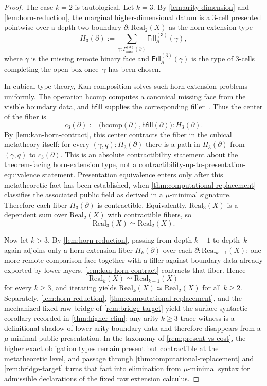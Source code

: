 \documentclass{lmcs}
\newcommand{\Real}{\mathrm{Real}}
\newcommand{\hcomp}{\mathrm{hcomp}}
\begin{document}
\begin{proof}
The case $k=2$ is tautological. Let $k=3$. By \autoref{lem:arity-dimension} and \autoref{lem:horn-reduction}, the marginal higher-dimensional datum is a $3$-cell presented pointwise over a depth-two boundary $\partial : \Real_2(X)$ as the horn-extension type
\[
  H_3(\partial)
  :=
  \sum_{\gamma : \Gamma^{(3)}_{\mathrm{miss}}(\partial)}
  \mathsf{Fill}^{(3)}_{\partial}(\gamma),
\]
where $\gamma$ is the missing remote binary face and $\mathsf{Fill}^{(3)}_{\partial}(\gamma)$ is the type of $3$-cells completing the open box once~$\gamma$ has been chosen.

In cubical type theory, Kan composition solves such horn-extension problems uniformly. The operation $\hcomp$ computes a canonical missing face from the visible boundary data, and $\mathsf{hfill}$ supplies the corresponding filler~\cite{cubical,cchm-hits}. Thus the center of the fiber is
\[
  c_3(\partial)
  :=
  \bigl(\hcomp(\partial),\mathsf{hfill}(\partial)\bigr)
  :
  H_3(\partial).
\]
By \autoref{lem:kan-horn-contract}, this center contracts the fiber in the
cubical metatheory itself: for every $(\gamma,q):H_3(\partial)$ there is a path
in $H_3(\partial)$ from $(\gamma,q)$ to $c_3(\partial)$. This is an absolute
contractibility statement about the theorem-facing horn-extension type, not a
contractibility-up-to-presentation-equivalence statement. Presentation
equivalence enters only after this metatheoretic fact has been established,
when \autoref{thm:computational-replacement} classifies the associated public
field as derived in a $\mu$-minimal signature. Therefore each fiber
$H_3(\partial)$ is contractible. Equivalently, $\Real_3(X)$ is a dependent sum
over $\Real_2(X)$ with contractible fibers, so
\[
  \Real_3(X) \simeq \Real_2(X).
\]

Now let $k>3$. By \autoref{lem:horn-reduction}, passing from depth $k-1$ to depth~$k$ again adjoins only a horn-extension fiber $H_k(\partial)$ over each $\partial : \Real_{k-1}(X)$: one more remote comparison face together with a filler against boundary data already exported by lower layers. \autoref{lem:kan-horn-contract} contracts that fiber. Hence
\[
  \Real_k(X) \simeq \Real_{k-1}(X)
\]
for every $k \geq 3$, and iterating yields $\Real_k(X) \simeq \Real_2(X)$ for all $k \geq 2$. Separately, \autoref{lem:horn-reduction}, \autoref{thm:computational-replacement}, and the mechanized fixed raw bridge of \autoref{rem:bridge-target} yield the surface-syntactic corollary recorded in \autoref{thm:higher-elim}: any arity-$k \geq 3$ trace witness is a definitional shadow of lower-arity boundary data and therefore disappears from a $\mu$-minimal public presentation.
In the taxonomy of \autoref{rem:present-vs-cost}, the higher exact obligation types remain present but contractible at the metatheoretic level, and passage through \autoref{thm:computational-replacement} and \autoref{rem:bridge-target} turns that fact into elimination from $\mu$-minimal syntax for admissible declarations of the fixed raw extension calculus.
\end{proof}
\end{document}
